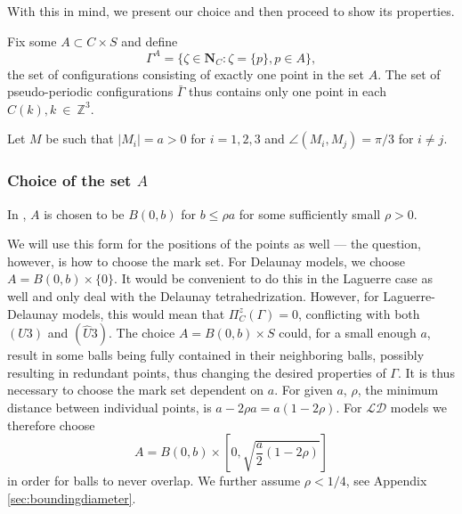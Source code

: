 With this in mind, we present our choice and then proceed to show its properties.\newline 

\noindent Fix some $A \subset C\times S$ and define
$$\Gamma^A = \{\zeta \in \mathbf N_C: \zeta = \{p\}, p \in A\},$$
the set of configurations consisting of exactly one point in the set $A$. The set of pseudo-periodic configurations $\bar\Gamma$ thus contains only one point in each $C(k), k~\in~\mathbb Z^3$.

Let $M$ be such that $|M_i| = a > 0$ for $i=1,2,3$ and $\angle(M_i,M_j) = \pi / 3$ for $i\neq j$.

\subsubsection{Choice of the set $A$}\label{sec:setA}
In \cite{DDG12}, $A$ is chosen to be $B(0,b)$ for $b\leq \rho a$ for some sufficiently small $\rho >0$. 

We will use this form for the positions of the points as well --- the question, however, is how to choose the mark set. For Delaunay models, we choose $A=B(0,b)\times\{0\}$. It would be convenient to do this in the Laguerre case as well and only deal with the Delaunay tetrahedrization. However, for Laguerre-Delaunay models, this  would mean that $\Pi^z_C(\Gamma) = 0$, conflicting with both $(U3)$ and $(\hat U3)$. The choice $A=B(0,b)\times S$ could, for a small enough $a$, result in some balls being fully contained in their neighboring balls, possibly resulting in redundant points, thus changing the desired properties of $\Gamma$. It is thus necessary to choose the mark set dependent on $a$. For given $a$, $\rho$, the minimum distance between individual points, is $a-2\rho a = a(1-2\rho)$. For $\mathcal {LD}$ models we therefore choose 
\begin{equation}\label{eq:choiceA} A = B(0,b)\times \left[0, \sqrt{\frac a2(1-2\rho)}\right] \end{equation}
in order for balls to never overlap. We further assume $\rho < 1/4$, see Appendix \ref{sec:boundingdiameter}.




